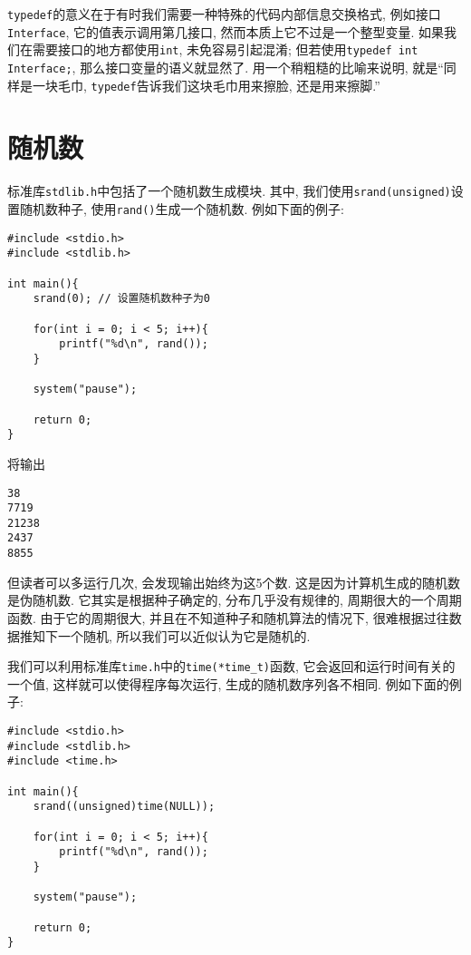         \texttt{typedef}的意义在于有时我们需要一种特殊的代码内部信息交换格式, 例如接口\texttt{Interface}, 它的值表示调用第几接口, 然而本质上它不过是一个整型变量. 如果我们在需要接口的地方都使用\texttt{int}, 未免容易引起混淆; 但若使用\texttt{typedef int Interface;}, 那么接口变量的语义就显然了. 用一个稍粗糙的比喻来说明, 就是``同样是一块毛巾, \texttt{typedef}告诉我们这块毛巾用来擦脸, 还是用来擦脚.''

    \section{随机数}
        标准库\texttt{stdlib.h}中包括了一个随机数生成模块. 其中, 我们使用\texttt{srand(unsigned)}设置随机数种子, 使用\texttt{rand()}生成一个随机数. 例如下面的例子:
\begin{lstlisting}
#include <stdio.h>
#include <stdlib.h>

int main(){
    srand(0); // 设置随机数种子为0

    for(int i = 0; i < 5; i++){
        printf("%d\n", rand());
    }

    system("pause");

    return 0;
}
\end{lstlisting}
        将输出
\begin{lstlisting}
38
7719
21238
2437
8855
\end{lstlisting}

        但读者可以多运行几次, 会发现输出始终为这5个数. 这是因为计算机生成的随机数是伪随机数. 它其实是根据种子确定的, 分布几乎没有规律的, 周期很大的一个周期函数. 由于它的周期很大, 并且在不知道种子和随机算法的情况下, 很难根据过往数据推知下一个随机, 所以我们可以近似认为它是随机的.

        我们可以利用标准库\texttt{time.h}中的\texttt{time(*time\_t)}函数, 它会返回和运行时间有关的一个值, 这样就可以使得程序每次运行, 生成的随机数序列各不相同. 例如下面的例子:
\begin{lstlisting}
#include <stdio.h>
#include <stdlib.h>
#include <time.h>

int main(){
    srand((unsigned)time(NULL));

    for(int i = 0; i < 5; i++){
        printf("%d\n", rand());
    }

    system("pause");

    return 0;
}
\end{lstlisting}

